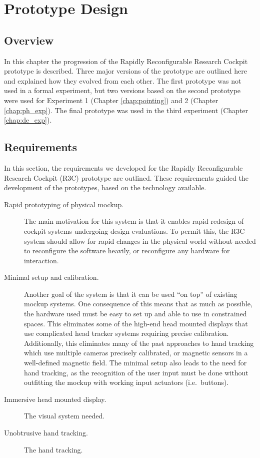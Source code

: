 \chapter{Prototype Design}
\label{chap:prototype}

\section{Overview}

In this chapter the progression of the Rapidly Reconfigurable Research Cockpit prototype is described.
Three major versions of the prototype are outlined here and explained how they evolved from each other.
The first prototype was not used in a formal experiment, but two versions based on the second prototype were used for Experiment 1 (Chapter \ref{chap:pointing}) and 2 (Chapter \ref{chap:ph_exp}).
The final prototype was used in the third experiment (Chapter \ref{chap:de_exp}).

\section{Requirements}

In this section, the requirements we developed for the Rapidly Reconfigurable Research Cockpit (R3C) prototype are outlined.
These requirements guided the development of the prototypes, based on the technology available.

\begin{description}
    \item [Rapid prototyping of physical mockup.]
        The main motivation for this system is that it enables rapid redesign of cockpit systems undergoing design evaluations.
        To permit this, the R3C system should allow for rapid changes in the physical world without needed to reconfigure the software heavily, or reconfigure any hardware for interaction.
    \item [Minimal setup and calibration.]
        Another goal of the system is that it can be used ``on top'' of existing mockup systems.
        One consequence of this means that as much as possible, the hardware used must be easy to set up and able to use in constrained spaces.
        This eliminates some of the high-end head mounted displays that use complicated head tracker systems requiring precise calibration.
        Additionally, this eliminates many of the past approaches to hand tracking which use multiple cameras precisely calibrated, or magnetic sensors in a well-defined magnetic field.
        The minimal setup also leads to the need for hand tracking, as the recognition of the user input must be done without outfitting the mockup with working input actuators (i.e.\ buttons).
    \item [Immersive head mounted display.]
        The visual system needed.
    \item [Unobtrusive hand tracking.]
        The hand tracking.
\end{description}

